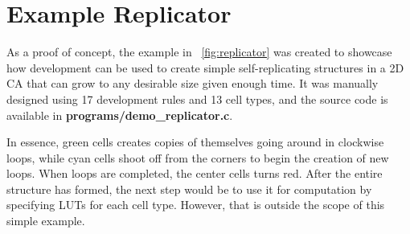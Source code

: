 
\section{Example Replicator}

As a proof of concept, the example in \figurename~\ref{fig:replicator} was created to showcase how development can be used to create simple self-replicating structures in a 2D CA that can grow to any desirable size given enough time.
It was manually designed using 17 development rules and 13 cell types, and the source code is available in \textbf{programs/demo\_replicator.c}.

In essence, green cells creates copies of themselves going around in clockwise loops, while cyan cells shoot off from the corners to begin the creation of new loops.
When loops are completed, the center cells turns red.
After the entire structure has formed, the next step would be to use it for computation by specifying LUTs for each cell type.
However, that is outside the scope of this simple example.


